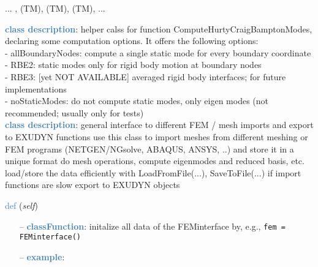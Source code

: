 \begin{itemize}[leftmargin=1.4cm]
\begin{itemize}[leftmargin=0.5cm]
\begin{itemize}[leftmargin=1.4cm]
\begin{itemize}[leftmargin=0.5cm]
 ...
, 
 (TM), 
 (TM), 
 (TM), 
 ...
\ei

%
\noindent\textcolor{steelblue}{{\bf class description}}:  helper calss for function ComputeHurtyCraigBamptonModes, declaring some computation options. It offers the following options:\\
 - allBoundaryNodes:     compute a single static mode for every boundary coordinate\\
 - RBE2:                 static modes only for rigid body motion at boundary nodes\\
 - RBE3:                 [yet NOT AVAILABLE] averaged rigid body interfaces; for future implementations\\
 - noStaticModes:        do not compute static modes, only eigen modes (not recommended; usually only for tests)
\vspace{3pt} \\ 
\noindent\textcolor{steelblue}{{\bf class description}}:  general interface to different FEM / mesh imports and export to EXUDYN functions
         use this class to import meshes from different meshing or FEM programs (NETGEN/NGsolve, ABAQUS, ANSYS, ..) and store it in a unique format
         do mesh operations, compute eigenmodes and reduced basis, etc.
         load/store the data efficiently with LoadFromFile(...), SaveToFile(...)  if import functions are slow
         export to EXUDYN objects
\vspace{3pt} \\ 
\begin{flushleft}
\noindent \textcolor{steelblue}{def {\bf {}}}\label{sec:FEM:FEMinterface:__init__}
({\it self})
\end{flushleft}
\setlength{\itemindent}{0.7cm}
\begin{itemize}[leftmargin=0.7cm]
  \item[--]  \textcolor{steelblue}{\bf classFunction}: initalize all data of the FEMinterface by, e.g., \texttt{fem = FEMinterface()}  \item[--]  \textcolor{steelblue}{\bf example}: \vspace{-12pt}\ei\begin{lstlisting}[language=Python, xleftmargin=36pt]

\end{lstlisting}
\end{itemize}
\end{itemize}
\end{itemize}
\end{itemize}
\end{itemize}
